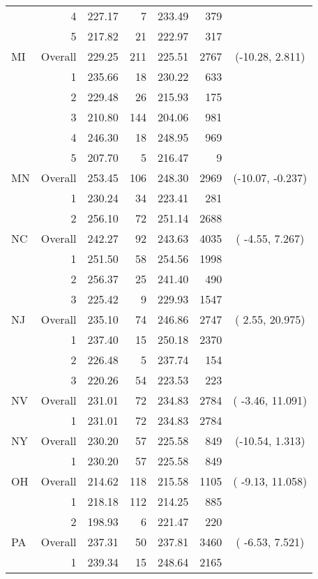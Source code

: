 \begin{longtable}{lrrr@{\extracolsep{.25cm}}rrc}
   & 4 & 227.17 &   7 & 233.49 & 379 &  \\ 
   & 5 & 217.82 &  21 & 222.97 & 317 &  \\ 
   \hline
MI & Overall & 229.25 & 211 & 225.51 & 2767 & (-10.28,  2.811) \\ 
   & 1 & 235.66 &  18 & 230.22 & 633 &  \\ 
   & 2 & 229.48 &  26 & 215.93 & 175 &  \\ 
   & 3 & 210.80 & 144 & 204.06 & 981 &  \\ 
   & 4 & 246.30 &  18 & 248.95 & 969 &  \\ 
   & 5 & 207.70 &   5 & 216.47 &   9 &  \\ 
   \hline
MN & Overall & 253.45 & 106 & 248.30 & 2969 & (-10.07, -0.237) \\ 
   & 1 & 230.24 &  34 & 223.41 & 281 &  \\ 
   & 2 & 256.10 &  72 & 251.14 & 2688 &  \\ 
   \hline
NC & Overall & 242.27 &  92 & 243.63 & 4035 & ( -4.55,  7.267) \\ 
   & 1 & 251.50 &  58 & 254.56 & 1998 &  \\ 
   & 2 & 256.37 &  25 & 241.40 & 490 &  \\ 
   & 3 & 225.42 &   9 & 229.93 & 1547 &  \\ 
   \hline
NJ & Overall & 235.10 &  74 & 246.86 & 2747 & (  2.55, 20.975) \\ 
   & 1 & 237.40 &  15 & 250.18 & 2370 &  \\ 
   & 2 & 226.48 &   5 & 237.74 & 154 &  \\ 
   & 3 & 220.26 &  54 & 223.53 & 223 &  \\ 
   \hline
NV & Overall & 231.01 &  72 & 234.83 & 2784 & ( -3.46, 11.091) \\ 
   & 1 & 231.01 &  72 & 234.83 & 2784 &  \\ 
   \hline
NY & Overall & 230.20 &  57 & 225.58 & 849 & (-10.54,  1.313) \\ 
   & 1 & 230.20 &  57 & 225.58 & 849 &  \\ 
   \hline
OH & Overall & 214.62 & 118 & 215.58 & 1105 & ( -9.13, 11.058) \\ 
   & 1 & 218.18 & 112 & 214.25 & 885 &  \\ 
   & 2 & 198.93 &   6 & 221.47 & 220 &  \\ 
   \hline
PA & Overall & 237.31 &  50 & 237.81 & 3460 & ( -6.53,  7.521) \\ 
   & 1 & 239.34 &  15 & 248.64 & 2165 &  \\ 

\end{longtable}
